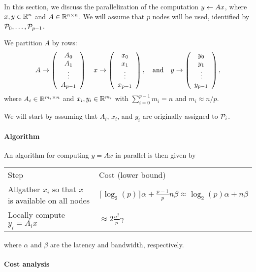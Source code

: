 


In this section, we discuss the parallelization of the
computation $ y \leftarrow A x $, where $ x, y \in \mathbb{R}^{n} $ and $ A \in \mathbb{R}^{n \times n} $.
We will assume that $ p $ nodes will be used, identified by $ {\cal P}_0, 
\ldots , {\cal P}_{p-1} $.

We partition $A$ by rows:
\[
A \rightarrow \left( \begin{array}{c} A_0 \\ A_1 \\ \vdots \\ A_{p-1} \end{array} \right) 
\quad
x \rightarrow \left( \begin{array}{c} x_0 \\ x_1 \\ \vdots \\ x_{p-1} \end{array} \right) ,
\quad
\mbox{and}
\quad
y \rightarrow \left( \begin{array}{c} y_0 \\ y_1 \\ \vdots \\ y_{p-1} \end{array} \right) ,
\]
where $ A_i \in \mathbb{R}^{m_i \times n} $ and $ x_i, y_i \in \mathbb{R}^{m_i} $ with
$ \sum_{i=0}^{p-1} m_i = n $ and $ m_i \approx n / p $.

We will start by assuming
that $ A_i $, $ x_i $, and $ y_i $ are originally assigned to $ {\cal P}_i $.

\paragraph*{Algorithm}

An algorithm for computing $ y = A x $ in parallel is then given by
\\[0.1in]
\begin{center}
\begin{tabular}{| p{3.5in} |  p{3.0in} |}\hline
Step & Cost (lower bound) \\ \whline
Allgather $ x_i $ so that $ x $ is available on all nodes & 
$ \lceil \log_2(p)\rceil \alpha + \frac{p-1}{p} n \beta \approx
\log_2(p) \alpha + n \beta $ \\
Locally compute $ y_i = A_i x $ &
$ \approx 2 \frac{n^2}{p} \gamma $ \\ \hline
\end{tabular}
\end{center}
where $\alpha$ and $\beta$ are the latency and bandwidth,
respectively.

\paragraph*{Cost analysis}

